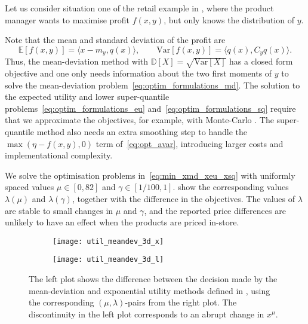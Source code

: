 \documentclass[main.tex]{subfiles}
\begin{document}
\begin{example}
  Let us consider situation one of the retail example in
  , where the product manager wants
  to maximise profit $f(x,y)$, but only knows the distribution of $y$.

  Note that the mean and standard deviation of the profit are
  \begin{equation}
    \mathbb{E}[f(x,y)]
    = \langle x-m_y,q(x) \rangle,\qquad
    \mbox{Var}[f(x,y)]
    = \langle q(x),C_y q(x) \rangle.
  \end{equation}
  Thus, the mean-deviation method with
  $\mathbb{D}[X]=\sqrt{\mbox{Var}[X]}$ has a closed form objective and
  one only needs information about the two first moments of $y$ to solve
  the mean-deviation problem~\eqref{eq:optim_formulations_md}.
  The solution to the expected utility and lower super-quantile
  problems~\eqref{eq:optim_formulations_eu}
  and~\eqref{eq:optim_formulations_sq} require that we approximate the
  objectives, for example, with Monte-Carlo
  \citep{caflisch1998monte}.
  The super-quantile method also needs an extra smoothing step to
  handle the $\max(\eta-f(x,y),0)$ term of~\eqref{eq:opt_avar},
  introducing larger costs and implementational complexity.

  We solve the optimisation problems in~\eqref{eq:min_xmd_xeu_xsq} with
  uniformly spaced values $\mu\in[0,82]$ and $\gamma\in[1/100, 1]$.
   show the
  corresponding values $\lambda(\mu)$ and $\lambda(\gamma)$, together
  with the difference in the objectives. The values of $\lambda$
  are stable to small changes in $\mu$ and $\gamma$, and the
  reported price differences are unlikely to have an effect when
  the products are priced in-store.
  \begin{figure}[htbp]
    \centering
    \begin{subfigure}[t]{.5\textwidth}
      \texttt{[image: util\_meandev\_3d\_x]}
    \end{subfigure}%
    \begin{subfigure}[t]{.5\textwidth}
      \texttt{[image: util\_meandev\_3d\_l]}
    \end{subfigure}
    \caption[Comparison between two decision maker models.]{The left plot shows the difference between the decision made
      by the mean-deviation and exponential utility methods defined in
      , using the corresponding
      $(\mu,\lambda)$-pairs from the right plot.
      The discontinuity in the left plot corresponds to an abrupt
      change in $x^\mu$.%
    }\label{fig:util_meandev_2d}
  \end{figure}


\end{example}
\end{document}

